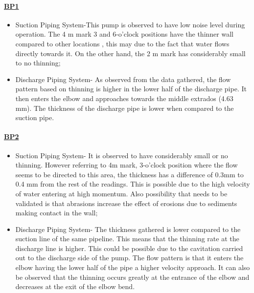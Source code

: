 \paragraph{\underline{BP1}}
\begin{itemize}
\item Suction Piping System-This pump is observed to have low noise level during operation. The 4 m mark 3 and 6-o’clock positions have the thinner wall compared to other locations , this may due to the fact that water flows directly towards it. On the other hand, the 2 m mark has considerably small to no thinning;

\item Discharge Piping System- As observed from the data gathered, the flow pattern based on thinning is higher in the lower half of the discharge pipe. It then enters the elbow and approaches towards the middle extrados (4.63 mm). The thickness of the discharge pipe is lower when compared to the suction pipe.

\end{itemize}

\paragraph{\underline{BP2}}
\begin{itemize}
\item Suction Piping System- It is observed to have considerably small or no thinning. However referring to 4m mark, 3-o'clock position where the flow seems to be directed to this area, the thickness has a difference of 0.3mm to 0.4 mm from the rest of the readings. This is possible due to the high velocity of water entering at high momentum. Also possibility that needs to be validated is that abrasions increase the effect of erosions due to sediments making contact in the wall;

\item Discharge Piping System- The thickness gathered is lower compared to the suction line of the same pipeline. This means that the thinning rate at the discharge line is higher. This could be possible due to the cavitation carried out to the discharge side of the pump. The flow pattern is that it enters the elbow having the lower half of the pipe a higher velocity approach. It can also be observed that the thinning occurs greatly at the entrance of the elbow and decreases at the exit of the elbow bend.

\end{itemize}

